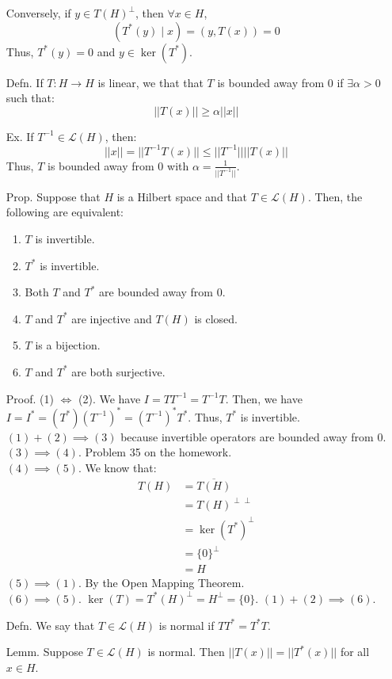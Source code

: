 \documentclass[12pt]{article}
\begin{document}
\begin{itemize}
    Conversely, if $y \in T(H)^\perp$, then $\forall x \in H$, 
    \[(T^*(y) \mid x) = (y, T(x)) = 0\]
    Thus, $T^*(y) = 0$ and $y \in \ker(T^*)$.
    \item[Defn.] If $T: H \to H$ is linear, we that that $T$ is bounded away from $0$ if $\exists \alpha > 0$ such that: 
    \[ ||T(x)|| \geq \alpha ||x||\]
    \item[Ex.] If $T^{-1} \in \mathcal L(H)$, then: 
    \[ ||x|| = ||T^{-1}T(x)|| \leq ||T^{-1}||||T(x)||\]
    Thus, $T$ is bounded away from $0$ with $\alpha = \frac{1}{||T^{-1}||}$.
    \item[Prop.] Suppose that $H$ is a Hilbert space and that $T \in \mathcal L(H)$. Then, the following are equivalent: 
    \begin{enumerate}
        \item $T$ is invertible.
        \item $T^*$ is invertible.
        \item Both $T$ and $T^*$ are bounded away from $0$.
        \item $T$ and $T^*$ are injective and $T(H)$ is closed. 
        \item $T$ is a bijection. 
        \item $T$ and $T^*$ are both surjective.
    \end{enumerate}
    Proof. (1) $\iff$ (2). We have $I = TT^{-1} = T^{-1}T$. Then, 
    we have $I = I^* = (T^*)(T^{-1})^* = (T^{-1})^*T^*$. Thus, $T^*$ is invertible. \\
    $(1) + (2) \implies (3)$ because invertible operators are bounded away from $0$. \\
    $(3) \implies (4)$. Problem 35 on the homework. \\
    $(4) \implies (5)$. We know that: 
    \begin{align*}
        T(H) &= \overline{T(H)} \\
        &= T(H)^{\perp\perp} \\
        &= \ker(T^*)^\perp \\
        &= \{0\}^\perp \\
        &= H
    \end{align*}
    $(5) \implies (1)$. By the Open Mapping Theorem. \\
    $(6) \implies (5)$. $\ker(T) = T^*(H)^\perp = H^\perp = \{0\}$.
    $(1) + (2) \implies (6)$.
    \item[Defn.] We say that $T \in \mathcal L(H)$ is normal if $TT^* = T^*T$. 
    \item[Lemm.] Suppose $T \in \mathcal L(H)$ is normal. Then $||T(x)|| = ||T^*(x)||$ for all $x \in H$.

\end{itemize}
\end{document}
